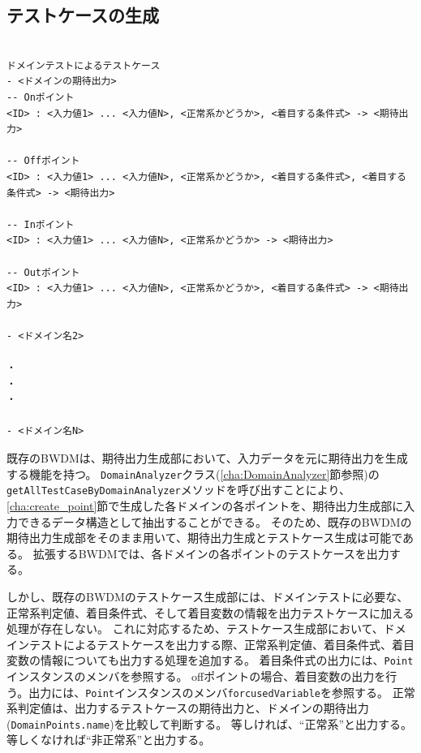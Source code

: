 \documentclass[uplatex, report, a4j, 10pt]{jsbook}
\newcommand\ttt[1]{\texttt{#1}}
\begin{document}
\subsection{テストケースの生成}
\lstset{language=}
\noindent\begin{minipage}{\textwidth}
  \begin{lstlisting}[caption=ドメイン分析テストのためのテストケースの出力フォーマット,label=fig:dmin_output_format]

ドメインテストによるテストケース
- <ドメインの期待出力>
-- Onポイント
<ID> : <入力値1> ... <入力値N>, <正常系かどうか>, <着目する条件式> -> <期待出力>

-- Offポイント
<ID> : <入力値1> ... <入力値N>, <正常系かどうか>, <着目する条件式>, <着目する条件式> -> <期待出力>

-- Inポイント
<ID> : <入力値1> ... <入力値N>, <正常系かどうか> -> <期待出力>

-- Outポイント
<ID> : <入力値1> ... <入力値N>, <正常系かどうか>, <着目する条件式> -> <期待出力>

- <ドメイン名2>

・
・
・

- <ドメイン名N>

\end{lstlisting}
\end{minipage}

既存のBWDMは、期待出力生成部において、入力データを元に期待出力を生成する機能を持つ。
\ttt{DomainAnalyzer}クラス(\ref{cha:DomainAnalyzer}節参照)の\ttt{getAllTestCaseByDomainAnalyzer}メソッドを呼び出すことにより、\ref{cha:create_point}節で生成した各ドメインの各ポイントを、期待出力生成部に入力できるデータ構造として抽出することができる。
そのため、既存のBWDMの期待出力生成部をそのまま用いて、期待出力生成とテストケース生成は可能である。
拡張するBWDMでは、各ドメインの各ポイントのテストケースを出力する。

しかし、既存のBWDMのテストケース生成部には、ドメインテストに必要な、正常系判定値、着目条件式、そして着目変数の情報を出力テストケースに加える処理が存在しない。
これに対応するため、テストケース生成部において、ドメインテストによるテストケースを出力する際、正常系判定値、着目条件式、着目変数の情報についても出力する処理を追加する。
着目条件式の出力には、\ttt{Point}インスタンスのメンバ\forcusedConditionalExpression{}を参照する。
offポイントの場合、着目変数の出力を行う。出力には、\ttt{Point}インスタンスのメンバ\ttt{forcusedVariable}を参照する。
正常系判定値は、出力するテストケースの期待出力と、ドメインの期待出力(\ttt{DomainPoints.name})を比較して判断する。
等しければ、“正常系”と出力する。等しくなければ“非正常系”と出力する。
\end{document}
